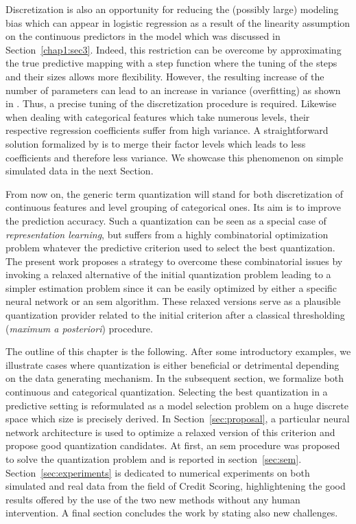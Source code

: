 Discretization is also an opportunity for reducing the (possibly large) modeling bias which can appear in logistic regression as a result of the linearity assumption on the continuous predictors in the model which was discussed in Section~\ref{chap1:sec3}. Indeed, this restriction can be overcome by approximating the true predictive mapping with a step function where the tuning of the steps and their sizes allows more flexibility. However, the resulting increase of the number of parameters can lead to an increase in variance (overfitting) as shown in \cite{yang2009discretization}. Thus, a precise tuning of the discretization procedure is required. Likewise when dealing with categorical features which take numerous levels, their respective regression coefficients suffer from high variance. A straightforward solution formalized by \cite{maj2015delete} is to merge their factor levels which leads to less coefficients and therefore less variance. We showcase this phenomenon on simple simulated data in the next Section.

From now on, the generic term quantization will stand for both discretization of continuous features and level grouping of categorical ones. Its aim is to improve the prediction accuracy. Such a quantization can be seen as a special case of \textit{representation learning}, but suffers from a highly combinatorial optimization problem whatever the predictive criterion used to select the best quantization. The present work proposes a strategy to overcome these combinatorial issues by invoking a relaxed alternative of the initial quantization problem leading to a simpler estimation problem since it can be easily optimized by either a specific neural network or an \gls{sem} algorithm. These relaxed versions serve as a plausible quantization provider related to the initial criterion after a classical thresholding (\textit{maximum a posteriori}) procedure.

The outline of this chapter is the following. After some introductory examples, we illustrate cases where quantization is either beneficial or detrimental depending on the data generating mechanism. In the subsequent section, we formalize both continuous and categorical quantization. Selecting the best quantization in a predictive setting is reformulated as a model selection problem on a huge discrete space which size is precisely derived. In Section~\ref{sec:proposal}, a particular neural network architecture is used to optimize a relaxed version of this criterion and propose good quantization candidates. At first, an \gls{sem} procedure was proposed to solve the quantization problem and is reported in section~\ref{sec:sem}. Section~\ref{sec:experiments} is dedicated to numerical experiments on both simulated and real data from the field of Credit Scoring, highlightening the good results offered by the use of the two new methods without any human intervention. A final section concludes the work by stating also new challenges.


